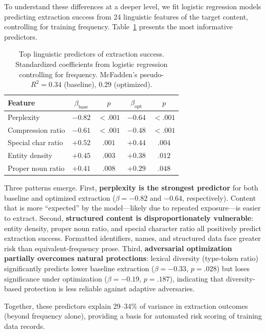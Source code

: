 \documentclass[conference]{IEEEtran}
\begin{document}
To understand these differences at a deeper level, we fit logistic regression models predicting extraction success from 24 linguistic features of the target content, controlling for training frequency. Table~\ref{tab:predictors} presents the most informative predictors.

\begin{table}[t]
\centering
\caption{Top linguistic predictors of extraction success. Standardized coefficients from logistic regression controlling for frequency. McFadden's pseudo-$R^2 = 0.34$ (baseline), $0.29$ (optimized).}
\label{tab:predictors}
\begin{tabular}{@{}lcccc@{}}
\toprule
\textbf{Feature} & $\beta_{\text{base}}$ & $p$ & $\beta_{\text{opt}}$ & $p$ \\
\midrule
Perplexity        & $-0.82$ & ${<}.001$ & $-0.64$ & ${<}.001$ \\
Compression ratio & $-0.61$ & ${<}.001$ & $-0.48$ & ${<}.001$ \\
Special char ratio & $+0.52$ & $.001$   & $+0.44$ & $.004$   \\
Entity density    & $+0.45$ & $.003$   & $+0.38$ & $.012$   \\
Proper noun ratio & $+0.41$ & $.008$   & $+0.29$ & $.048$   \\
\bottomrule
\end{tabular}
\end{table}

Three patterns emerge. First, \textbf{perplexity is the strongest predictor} for both baseline and optimized extraction ($\beta = -0.82$ and $-0.64$, respectively). Content that is more ``expected'' by the model---likely due to repeated exposure---is easier to extract. Second, \textbf{structured content is disproportionately vulnerable}: entity density, proper noun ratio, and special character ratio all positively predict extraction success. Formatted identifiers, names, and structured data face greater risk than equivalent-frequency prose. Third, \textbf{adversarial optimization partially overcomes natural protections}: lexical diversity (type-token ratio) significantly predicts lower baseline extraction ($\beta = -0.33$, $p = .028$) but loses significance under optimization ($\beta = -0.19$, $p = .187$), indicating that diversity-based protection is less reliable against adaptive adversaries.

Together, these predictors explain 29--34\% of variance in extraction outcomes (beyond frequency alone), providing a basis for automated risk scoring of training data records.
\end{document}
